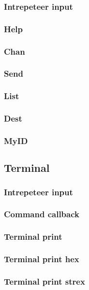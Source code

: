     \subsubsection{Intrepeteer input}
    \subsubsection{Help}
    \subsubsection{Chan}
    \subsubsection{Send}
    \subsubsection{List}
    \subsubsection{Dest}
    \subsubsection{MyID}

\subsection{Terminal}
    \subsubsection{Intrepeteer input}
    \subsubsection{Command callback}
    \subsubsection{Terminal print}
    \subsubsection{Terminal print hex}
    \subsubsection{Terminal print strex}

